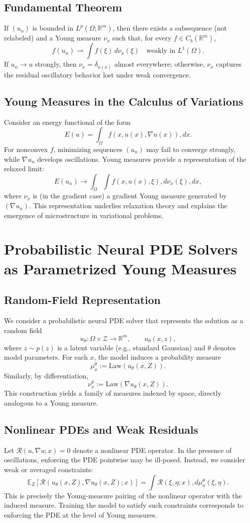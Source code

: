 \documentclass[11pt]{article}
\begin{document}
\subsection{Fundamental Theorem}
If $(u_n)$ is bounded in $L^p(\Omega;\mathbb{R}^m)$, then there exists a subsequence (not relabeled) and a Young measure $\nu_x$ such that, for every $f \in C_b(\mathbb{R}^m)$,
\[
f(u_n) \rightharpoonup \int f(\xi)\,d\nu_x(\xi)
\quad \text{weakly in } L^1(\Omega).
\]
If $u_n \to u$ strongly, then $\nu_x = \delta_{u(x)}$ almost everywhere; otherwise, $\nu_x$ captures the residual oscillatory behavior lost under weak convergence.

\subsection{Young Measures in the Calculus of Variations}
Consider an energy functional of the form
\[
E(u) = \int_\Omega f(x,u(x),\nabla u(x)),dx.
\]
For nonconvex $f$, minimizing sequences $(u_n)$ may fail to converge strongly, while $\nabla u_n$ develops oscillations. Young measures provide a representation of the relaxed limit:
\[
E(u_n) \to \int_\Omega \int f(x,u(x),\xi),d\nu_x(\xi),dx,
\]
where $\nu_x$ is (in the gradient case) a gradient Young measure generated by $(\nabla u_n)$. This representation underlies relaxation theory and explains the emergence of microstructure in variational problems.

\section{Probabilistic Neural PDE Solvers as Parametrized Young Measures}

\subsection{Random-Field Representation}
We consider a probabilistic neural PDE solver that represents the solution as a random field
\[
u_\theta : \Omega \times \mathcal{Z} \to \mathbb{R}^m, \qquad u_\theta(x,z),
\]
where $z \sim p(z)$ is a latent variable (e.g., standard Gaussian) and $\theta$ denotes model parameters. For each $x$, the model induces a probability measure
\[
\mu_x^\theta := \mathrm{Law}(u_\theta(x,Z)).
\]
Similarly, by differentiation,
\[
\nu_x^\theta := \mathrm{Law}(\nabla u_\theta(x,Z)).
\]
This construction yields a family of measures indexed by space, directly analogous to a Young measure.

\subsection{Nonlinear PDEs and Weak Residuals}
Let $\mathcal{R}(u,\nabla u;x)=0$ denote a nonlinear PDE operator. In the presence of oscillations, enforcing the PDE pointwise may be ill-posed. Instead, we consider weak or averaged constraints:
\[
\mathbb{E}_Z[\mathcal{R}(u_\theta(x,Z),\nabla u_\theta(x,Z);x)] = \int \mathcal{R}(\xi,\eta;x), d\mu_x^\theta(\xi,\eta).
\]
This is precisely the Young-measure pairing of the nonlinear operator with the induced measure. Training the model to satisfy such constraints corresponds to enforcing the PDE at the level of Young measures.
\end{document}
